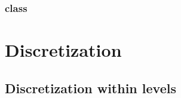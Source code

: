 \documentclass[10pt]{article}
\begin{document}
\begin{center}
\end{center}

\subsubsection{ class} \label{sss:class-array}

\section{Discretization} \label{s:discretization}

\newcommand{\indvar}{r}
 \newcommand{\uc}{u(\indvar)}

 \newcommand{\uxp}{u(\indvar+h_x)}
 \newcommand{\uxm}{u(\indvar-h_x)}
 \newcommand{\uxph}{u(\indvar+\frac{h_x}{2})}
 \newcommand{\uxmh}{u(\indvar-\frac{h_x}{2})}

 \newcommand{\uyp}{u(\indvar+h_y)}
 \newcommand{\uym}{u(\indvar-h_y)}
 \newcommand{\uyph}{u(\indvar+\frac{h_y}{2})}
 \newcommand{\uymh}{u(\indvar-\frac{h_y}{2})}

 \newcommand{\uzp}{u(\indvar+h_z)}
 \newcommand{\uzm}{u(\indvar-h_z)}
 \newcommand{\uzph}{u(\indvar+\frac{h_z}{2})}
 \newcommand{\uzmh}{u(\indvar-\frac{h_z}{2})}

 \newcommand{\ac}{a(\indvar)}
 \newcommand{\axph}{a(\indvar+\frac{h_x}{2})}
 \newcommand{\axmh}{a(\indvar-\frac{h_x}{2})}
 \newcommand{\ayph}{a(\indvar+\frac{h_y}{2})}
 \newcommand{\aymh}{a(\indvar-\frac{h_y}{2})}
 \newcommand{\azph}{a(\indvar+\frac{h_z}{2})}
 \newcommand{\azmh}{a(\indvar-\frac{h_z}{2})}

 \newcommand{\alc}{\alpha_{0}}
 \newcommand{\alxp}{\alpha_{x}}
 \newcommand{\alxm}{\alpha_{\bar{x}}}
 \newcommand{\alyp}{\alpha_{y}}
 \newcommand{\alym}{\alpha_{\bar{y}}}
 \newcommand{\alzp}{\alpha_{z}}
 \newcommand{\alzm}{\alpha_{\bar{z}}}

 \newcommand{\Uc}{U_{0}}
 \newcommand{\Uxp}{U_{x}}
 \newcommand{\Uxm}{U_{\bar{x}}}
 \newcommand{\Uyp}{U_{y}}
 \newcommand{\Uym}{U_{\bar{y}}}
 \newcommand{\Uzp}{U_{z}}
 \newcommand{\Uzm}{U_{\bar{z}}}

\subsection{Discretization within levels}
\end{document}
